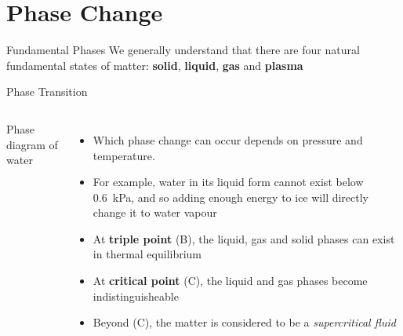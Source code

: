 \documentclass[12pt,aspectratio=169,dvipsnames]{beamer}
\begin{document}
\section{Phase Change}

\begin{frame}{Fundamental Phases}
  We generally understand that there are four natural fundamental states of
  matter: \textbf{solid}, \textbf{liquid}, \textbf{gas} and \textbf{plasma}
  \begin{center}
  \end{center}
\end{frame}



\begin{frame}{Phase Transition}
  \begin{columns}
    \centering
    Phase diagram of water\\

    \begin{itemize}
    \item Which phase change can occur depends on pressure and temperature.
    \item For example, water in its liquid form cannot exist below
      \SI{.6}{\kilo\pascal}, and so adding enough energy to ice will directly
      change it to water vapour
    \item At \textbf{triple point} (B), the liquid, gas and solid phases can
      exist in thermal equilibrium
    \item At \textbf{critical point} (C), the liquid and gas phases become
      indistinguisheable
    \item Beyond (C), the matter is considered to be a \emph{supercritical
    fluid}
    \end{itemize}
  \end{columns}
\end{frame}
\end{document}
